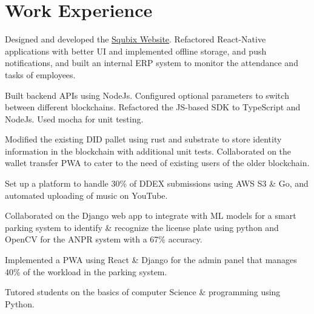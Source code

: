 \documentclass[]{assets/deedy-resume-openfont}
\begin{document}
  \section{Work Experience}
  \hfill {}
      \begin{tightemize}
       \item Designed and developed the {\href{https://squbix.com/}{ \underline{Squbix Website}}}. Refactored React-Native applications with better UI and implemented offline storage, and push notifications, and built an internal ERP system to monitor the attendance and tasks of employees.
       \item Built backend APIs using NodeJs. Configured optional parameters to switch between different blockchains. Refactored the JS-based SDK to TypeScript and NodeJs. Used mocha for unit testing.
       \item Modified the existing DID pallet using rust and substrate to store identity information in the blockchain with additional unit tests. Collaborated on the wallet transfer PWA to cater to the need of existing users of the older blockchain.
      \end{tightemize}
      \sectionsep
  \hfill {}
      \begin{tightemize}
    \item Set up a platform to handle 30\% of DDEX submissions using AWS S3 \& Go, and automated uploading of music on YouTube.
\end{tightemize}
      \sectionsep
  \hfill {}
      \begin{tightemize}
    \item Collaborated on the Django web app to integrate with ML models for a smart parking system to identify \& recognize the license plate using python and OpenCV for the ANPR system with a 67\% accuracy.
    \item Implemented a PWA using React \& Django for the admin panel that manages 40\% of the workload in the parking system.
\end{tightemize}
      \sectionsep
      \hfill {}
      \begin{tightemize}
    \item Tutored students on the basics of computer Science \& programming using Python.
    \end{tightemize}
      \sectionsep
%
%
\end{document}
